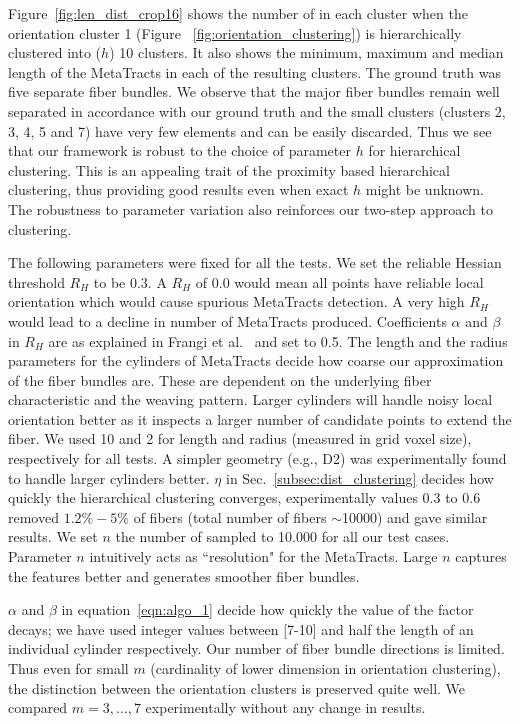 Figure~\ref{fig:len_dist_crop16} shows the number of \mt in each cluster when the orientation cluster 1 (Figure ~\ref{fig:orientation_clustering}) is hierarchically clustered into ($h$) 10 clusters. It also shows the minimum, maximum and median length of the MetaTracts in each of the resulting clusters. The ground truth was five separate fiber bundles. We observe that the major fiber bundles remain well separated in accordance with our ground truth and the small clusters (clusters 2, 3, 4, 5 and 7) have very few elements and can be easily discarded. Thus we see that our framework is robust to the choice of parameter $h$ for hierarchical clustering. This is an appealing trait of the proximity based hierarchical clustering, thus providing good results even when exact $h$ might be unknown. The robustness to parameter variation also reinforces our two-step approach to clustering. 


The following parameters were fixed for all the tests. We set the reliable Hessian threshold $R_{H}$ to be 0.3. A $R_{H}$ of 0.0 would mean all points have reliable local orientation which would cause spurious MetaTracts detection. A very high $ R_{H}$ would lead to a decline in number of MetaTracts produced. Coefficients $\alpha$ and $\beta$ in $R_{H}$ are as explained in Frangi et al.~\cite{Frangi1998} and set to 0.5. The length and the radius parameters for the cylinders of MetaTracts decide how coarse our approximation of the fiber bundles are. These are dependent on the underlying fiber characteristic and the weaving pattern. Larger cylinders will handle noisy local orientation better as it inspects a larger number of candidate points to extend the fiber. We used 10 and 2 for length and radius (measured in grid voxel size), respectively for all tests.  
A simpler geometry (e.g., D2) was experimentally found to handle larger cylinders better. $\eta$ in Sec.~\ref{subsec:dist_clustering} decides how quickly the hierarchical clustering converges, experimentally values 0.3 to 0.6 removed $1.2\% - 5\%$ of fibers (total number of fibers $\sim$10000) and gave similar results. We set $n$ the number of sampled \mt to 10.000 for all our test cases. Parameter $n$ intuitively acts as ``resolution" for the MetaTracts. Large $n$ captures the features better and generates smoother fiber bundles. 

$\alpha$ and $\beta$ in equation~\ref{eqn:algo_1} decide how quickly the value of the factor decays; we have used integer values between [7-10] and half the length of an individual cylinder respectively. Our number of fiber bundle directions is limited. Thus even for small $m$ (cardinality of lower dimension in orientation clustering), the distinction between the orientation clusters is preserved quite well. We compared $m=3,...,7$ experimentally without any change in results. 

